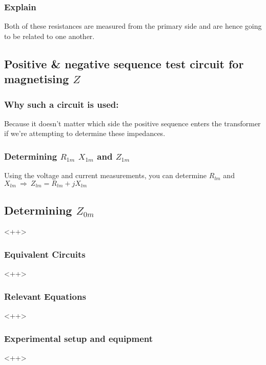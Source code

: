 \documentclass{article}
\begin{document}
\subsubsection{Explain} 

Both of these resistances are measured from the primary side and are hence going to be related to one another.

\subsection{Positive \& negative sequence test circuit for magnetising $Z$ } 

\subsubsection{Why such a circuit is used:} 

Because it doesn't matter which side the positive sequence enters the transformer if we're attempting to determine these impedances.

\subsubsection{Determining $R _{1m}$ $X _{1m}$ and  $Z _{1m}$}

Using the voltage and current measurements, you can determine $R_{lm}$ and $X_{lm} \ \Rightarrow \ Z_{lm} = R_{lm} + j X_{lm}$

\subsection{Determining $Z_{0m}$} 

<++>

\subsubsection{Equivalent Circuits} 

<++>

\subsubsection{Relevant Equations} 

<++>

\subsubsection{Experimental setup and equipment} 

<++>
\end{document}
